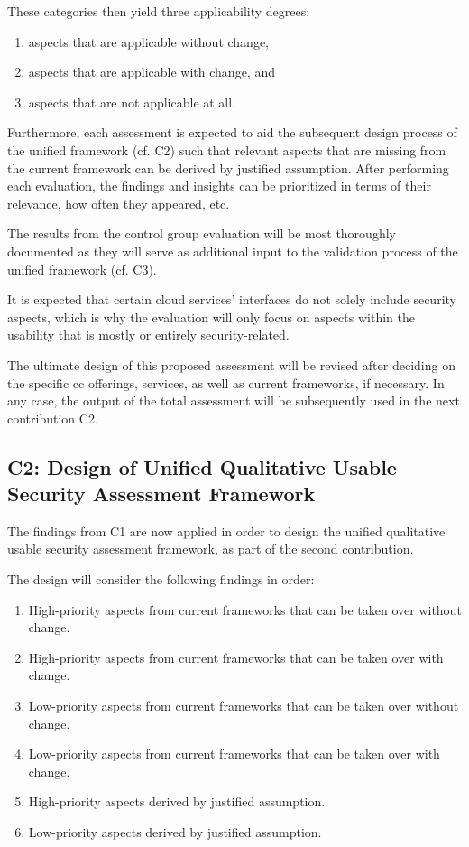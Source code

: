 These categories then yield three applicability degrees:

\begin{enumerate}
	\item aspects that are applicable without change,
	\item aspects that are applicable with change, and
	\item aspects that are not applicable at all.
\end{enumerate}

Furthermore, each assessment is expected to aid the subsequent design process of the unified framework (cf. C2) such that relevant aspects that are missing from the current framework can be derived by justified assumption. After performing each evaluation, the findings and insights can be prioritized in terms of their relevance, how often they appeared, etc.

The results from the control group evaluation will be most thoroughly documented as they will serve as additional input to the validation process of the unified framework (cf. C3).

It is expected that certain cloud services' interfaces do not solely include security aspects, which is why the evaluation will only focus on aspects within the usability that is mostly or entirely security-related.

The ultimate design of this proposed assessment will be revised after deciding on the specific \ac{cc} offerings, services, as well as current frameworks, if necessary. In any case, the output of the total assessment will be subsequently used in the next contribution C2.

\subsection{C2: Design of Unified Qualitative Usable Security Assessment Framework} \label{subs:approach-structure-design}

The findings from C1 are now applied in order to design the unified qualitative usable security assessment framework, as part of the second contribution.

The design will consider the following findings in order:

\begin{enumerate}
	\item High-priority aspects from current frameworks that can be taken over without change.
	\item High-priority aspects from current frameworks that can be taken over with change.
	\item Low-priority aspects from current frameworks that can be taken over without change.
	\item Low-priority aspects from current frameworks that can be taken over with change.
	\item High-priority aspects derived by justified assumption.
	\item Low-priority aspects derived by justified assumption.
\end{enumerate}

